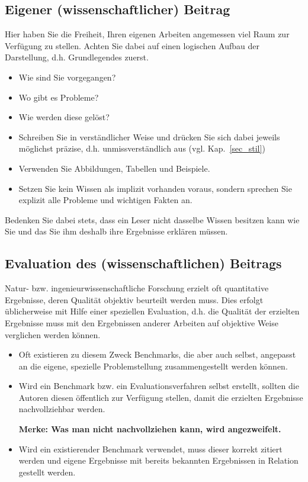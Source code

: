 \subsection{Eigener (wissenschaftlicher) Beitrag}
Hier haben Sie die Freiheit, Ihren eigenen Arbeiten angemessen viel Raum zur Verfügung zu stellen.
Achten Sie dabei auf einen logischen Aufbau der Darstellung, d.h. Grundlegendes zuerst.
\begin{itemize}
\item Wie sind Sie vorgegangen?
\item Wo gibt es Probleme?
\item Wie werden diese gelöst?
\item Schreiben Sie in verständlicher Weise und drücken Sie sich dabei jeweils möglichst präzise, d.h. unmissverständlich aus (vgl. Kap.~\ref{sec_stil})
\item Verwenden Sie Abbildungen, Tabellen und Beispiele.
\item Setzen Sie kein Wissen als implizit vorhanden voraus, sondern sprechen Sie explizit alle Probleme und wichtigen Fakten an.
\end{itemize}
Bedenken Sie dabei stets, dass ein Leser nicht dasselbe Wissen besitzen kann wie Sie und das Sie ihm deshalb ihre Ergebnisse erklären müssen.


\subsection{Evaluation des (wissenschaftlichen) Beitrags}
Natur- bzw. ingenieurwissenschaftliche Forschung erzielt oft quantitative Ergebnisse, deren Qualität objektiv beurteilt werden muss.
Dies erfolgt üblicherweise mit Hilfe einer speziellen Evaluation, d.h. die Qualität der erzielten Ergebnisse muss mit den Ergebnissen anderer Arbeiten auf objektive Weise verglichen werden können.

\begin{itemize}
\item Oft existieren zu diesem Zweck Benchmarks, die aber auch selbst, angepasst an die eigene, spezielle Problemstellung zusammengestellt werden können.
\item Wird ein Benchmark bzw. ein Evaluationsverfahren selbst erstellt, sollten die Autoren diesen öffentlich zur Verfügung stellen, damit die erzielten Ergebnisse nachvollziehbar werden.

{\bf Merke: Was man nicht nachvollziehen kann, wird angezweifelt.}
\item Wird ein existierender Benchmark verwendet, muss dieser korrekt zitiert werden und eigene Ergebnisse mit bereits bekannten Ergebnissen in Relation gestellt werden.
\end{itemize}



